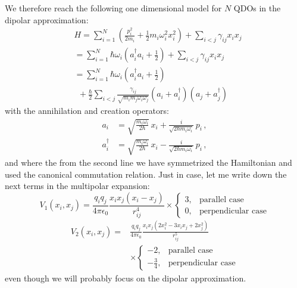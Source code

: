 \documentclass[reprint, amsmath, amssymb, aps]{revtex4-2}
\begin{document}
        We therefore reach the following one dimensional model for $N$ QDOs in the dipolar approximation:
        \begin{equation}
            \begin{split}
                &H = \sum_{i=1}^N\left(\frac{p_i^2}{2m_i}+\frac{1}{2}m_i\omega_i^2 x_i^2\right) + \sum_{i<j}\gamma_{ij}x_ix_j\\
                &= \sum_{i=1}^N\hbar\omega_i\left(a_i^\dagger a_i+\frac{1}{2}\right) + \sum_{i<j}\gamma_{ij}x_ix_j\\
                &= \sum_{i=1}^N\hbar\omega_i\left(a_i^\dagger a_i+\frac{1}{2}\right) \\
                &\ \ +\frac{\hbar}{2}\sum_{i<j}\frac{\gamma_{ij}}{\sqrt{m_im_j\omega_i\omega_j}}\left(a_i+a_i^\dagger\right)\left(a_j+a_j^\dagger\right)
            \end{split}
        \end{equation}
        with the annihilation and creation operators:
        \begin{equation}
            \begin{split}
                a_i &= \sqrt{\frac{m_i\omega_i}{2\hbar}}\,x_i+\frac{i}{\sqrt{2\hbar m_i\omega_i}}\,p_i\,,\\
                a_i^\dagger &= \sqrt{\frac{m_i\omega_i}{2\hbar}}\,x_i-\frac{i}{\sqrt{2\hbar m_i\omega_i}}\,p_i\,,
            \end{split}
        \end{equation}
        and where the from the second line we have symmetrized the Hamiltonian and used the canonical commutation relation.
        Just in case, let me write down the next terms in the multipolar expansion:
        \begin{equation}
            V_1(x_i, x_j) = \frac{q_iq_j}{4\pi\epsilon_0}\frac{x_ix_j(x_i-x_j)}{r_{ij}^4}\times
            \begin{cases}
                3, & \text{parallel case} \\
                0, & \text{perpendicular case}
            \end{cases}
        \end{equation}
        \begin{equation}
            \begin{split}
                V_2(x_i, x_j) = &\frac{q_iq_j}{4\pi\epsilon_0}\frac{x_ix_j(2x_i^2-3x_ix_j+2x_j^2)}{r_{ij}^5}\\
                &\times
                \begin{cases}
                    -2, & \text{parallel case} \\
                -\frac{3}{4}, & \text{perpendicular case}
                \end{cases}
            \end{split}
        \end{equation}
        even though we will probably focus on the dipolar approximation.
\end{document}
